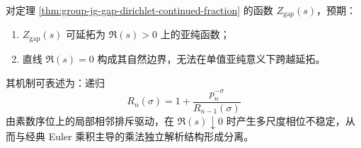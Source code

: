 \begin{conjecture}\label{conj:group-jg-gap-zeta-natural-boundary}
对定理 \ref{thm:group-jg-gap-dirichlet-continued-fraction} 的函数 \(Z_{\mathrm{gap}}(s)\)，预期：
\begin{enumerate}
  \item \(Z_{\mathrm{gap}}(s)\) 可延拓为 \(\Re(s)>0\) 上的亚纯函数；
  \item 直线 \(\Re(s)=0\) 构成其自然边界，无法在单值亚纯意义下跨越延拓。
\end{enumerate}
其机制可表述为：递归
\[
R_n(\sigma)=1+\frac{p_n^{-\sigma}}{R_{n-1}(\sigma)}
\]
由素数序位上的局部相邻排斥驱动，在 \(\Re(s)\downarrow 0\) 时产生多尺度相位不稳定，从而与经典 Euler 乘积主导的乘法独立解析结构形成分离。
\end{conjecture}

